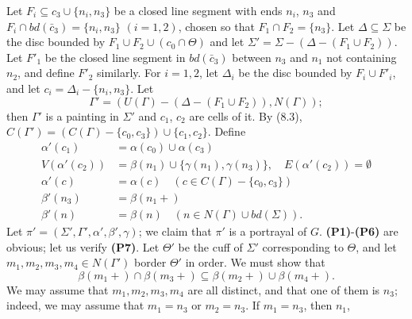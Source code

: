 Let $F_i \subseteq c_3 \cup \{n_i, n_3\}$ be a closed line segment with ends $n_i$, $n_3$ and $F_i \cap bd(\bar{c}_3) = \{n_i, n_3\}$ $(i = 1, 2)$, chosen so that $F_1 \cap F_2 = \{n_3\}$. Let $\Delta \subseteq \Sigma$ be the disc bounded by $F_1 \cup F_2 \cup (c_0 \cap \Theta)$ and let $\Sigma' = \Sigma - (\Delta - (F_1 \cup F_2))$. Let $F'_1$ be the closed line segment in $bd(\bar{c}_3)$ between $n_3$ and $n_1$ not containing $n_2$, and define $F'_2$ similarly. For $i = 1, 2$, let $\Delta_i$ be the disc bounded by $F_i \cup F'_i$, and let $c_i = \Delta_i - \{n_i, n_3\}$. Let
\begin{equation*}
\Gamma' = (U(\Gamma) - (\Delta - (F_1 \cup F_2)), N(\Gamma));
\end{equation*}
then $\Gamma'$ is a painting in $\Sigma'$ and $c_1$, $c_2$ are cells of it. By (8.3), $C(\Gamma') = (C(\Gamma) - \{c_0, c_3\}) \cup \{c_1, c_2\}$. Define
\begin{align*}
\alpha'(c_1) &= \alpha(c_0) \cup \alpha(c_3) \\
V(\alpha'(c_2)) &= \beta(n_1) \cup \{\gamma(n_1), \gamma(n_3)\}, \quad E(\alpha'(c_2)) = \emptyset \\
\alpha'(c) &= \alpha(c) \quad (c \in C(\Gamma) - \{c_0, c_3\}) \\
\beta'(n_3) &= \beta(n_1 +) \\
\beta'(n) &= \beta(n) \quad (n \in N(\Gamma) \cup bd(\Sigma)).
\end{align*}
Let $\pi' = (\Sigma', \Gamma', \alpha', \beta', \gamma)$; we claim that $\pi'$ is a portrayal of $G$. \textbf{(P1)}-\textbf{(P6)} are obvious; let us verify \textbf{(P7)}. Let $\Theta'$ be the cuff of $\Sigma'$ corresponding to $\Theta$, and let $m_1, m_2, m_3, m_4 \in N(\Gamma')$ border $\Theta'$ in order. We must show that
\begin{equation*}
\beta(m_1 +) \cap \beta(m_3 +) \subseteq \beta(m_2 +) \cup \beta(m_4 +).
\end{equation*}
We may assume that $m_1, m_2, m_3, m_4$ are all distinct, and that one of them is $n_3$; indeed, we may assume that $m_1 = n_3$ or $m_2 = n_3$. If $m_1 = n_3$, then $n_1$,
